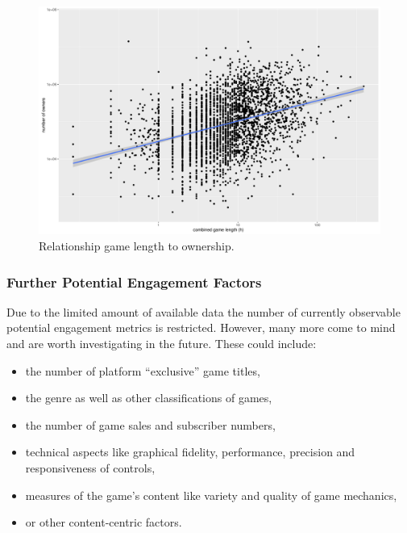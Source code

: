 \begin{figure}[!t]
	\centering
	\includegraphics[width=1.0\columnwidth]{images/rel-combinedlength-owners.pdf}
	\caption{Relationship game length to ownership.}
\label{fig:rel-combinedlength-owners}
\end{figure}


\subsubsection{Further Potential Engagement Factors}

Due to the limited amount of available data the number of currently observable potential engagement metrics is restricted. However, many more come to mind and are worth investigating in the future. These could include:

\begin{itemize}
	\item the number of platform ``exclusive'' game titles,
	\item the genre as well as other classifications of games,
	\item the number of game sales and subscriber numbers,
	\item technical aspects like graphical fidelity, performance, precision and responsiveness of controls,
	\item measures of the game's content like variety and quality of game mechanics,
	\item or other content-centric factors.
\end{itemize}





